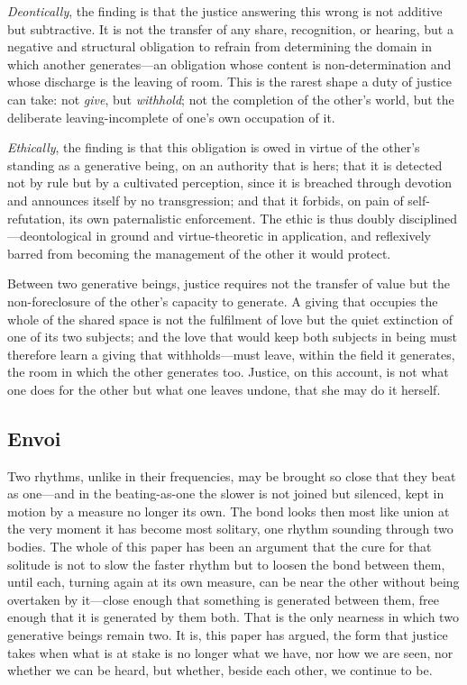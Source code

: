 \emph{Deontically}, the finding is that the justice answering this wrong is not additive but subtractive. It is not the transfer of any share, recognition, or hearing, but a negative and structural obligation to refrain from determining the domain in which another generates---an obligation whose content is non-determination and whose discharge is the leaving of room. This is the rarest shape a duty of justice can take: not \emph{give}, but \emph{withhold}; not the completion of the other's world, but the deliberate leaving-incomplete of one's own occupation of it.

\emph{Ethically}, the finding is that this obligation is owed in virtue of the other's standing as a generative being, on an authority that is hers; that it is detected not by rule but by a cultivated perception, since it is breached through devotion and announces itself by no transgression; and that it forbids, on pain of self-refutation, its own paternalistic enforcement. The ethic is thus doubly disciplined---deontological in ground and virtue-theoretic in application, and reflexively barred from becoming the management of the other it would protect.

\begin{claim}
Between two generative beings, justice requires not the transfer of value but the non-foreclosure of the other's capacity to generate. A giving that occupies the whole of the shared space is not the fulfilment of love but the quiet extinction of one of its two subjects; and the love that would keep both subjects in being must therefore learn a giving that withholds---must leave, within the field it generates, the room in which the other generates too. Justice, on this account, is not what one does for the other but what one leaves undone, that she may do it herself.
\end{claim}

\subsection*{Envoi}
\noindent
Two rhythms, unlike in their frequencies, may be brought so close that they beat as one---and in the beating-as-one the slower is not joined but silenced, kept in motion by a measure no longer its own. The bond looks then most like union at the very moment it has become most solitary, one rhythm sounding through two bodies. The whole of this paper has been an argument that the cure for that solitude is not to slow the faster rhythm but to loosen the bond between them, until each, turning again at its own measure, can be near the other without being overtaken by it---close enough that something is generated between them, free enough that it is generated by them both. That is the only nearness in which two generative beings remain two. It is, this paper has argued, the form that justice takes when what is at stake is no longer what we have, nor how we are seen, nor whether we can be heard, but whether, beside each other, we continue to be.
